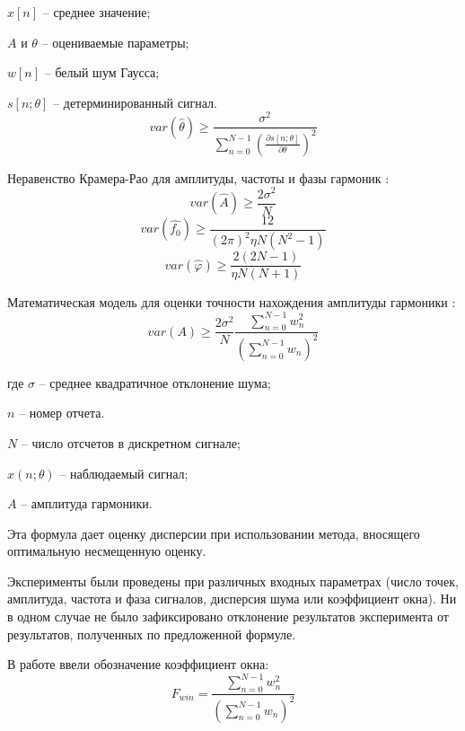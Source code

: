 $x[n]$ -- среднее значение;

$A$ и $\theta$  -- оцениваемые параметры;

$w[n]$ -- белый шум Гаусса;

$s[n;\theta]$ -- детерминированный сигнал.
\begin{equation}
	\label{eq:equation14}
	var(\hat{\theta}) \geq \frac{\sigma^2}{\displaystyle\sum_{n=0}^{N-1} \left(\frac{\partial s [n; \theta]}{\partial\theta}\right)^2} 
\end{equation}

Неравенство Крамера-Рао для амплитуды, частоты и фазы гармоник \cite{kay1993fundamentals}:
\begin{equation}
	\label{eq:equation16}
	var(\hat{A})\geq \frac{2  \sigma^2}{N} 
\end{equation}
\begin{equation}
	\label{eq:equation17}
	var(\hat{f_0})\geq \frac{12}{(2\pi)^2 \eta  N(N^2 - 1)}  
\end{equation}
\begin{equation}
	\label{eq:equation18}
	var(\hat{\varphi})\geq \frac{2(2N-1)}{\eta N(N+1)}  
\end{equation}

Математическая модель для оценки точности нахождения амплитуды гармоники \cite{altman2020boundary}:
\begin{equation}
	\label{eq:equation24}
	var(A)\geq \frac{2\sigma^2}{N} \frac{\sum_{n=0}^{N-1}w_n^2}{\left(\sum_{n=0}^{N-1} w_n \right)^2} 			  
\end{equation}

где $\sigma$ -- среднее квадратичное отклонение шума;

$n$ – номер отчета.

$N$ – число отсчетов в дискретном сигнале;

$x(n;\theta)$ – наблюдаемый сигнал;

$A$ – амплитуда гармоники. 

Эта формула дает оценку дисперсии при использовании метода, вносящего оптимальную несмещенную оценку. 

Эксперименты были проведены при различных входных параметрах (число точек, амплитуда, частота и фаза сигналов, дисперсия шума или коэффициент окна). Ни в одном случае не было зафиксировано отклонение результатов эксперимента от результатов, полученных по предложенной формуле.

В работе \cite{altman2020boundary} ввели обозначение коэффициент окна:
\begin{equation}
	\label{eq:equation25}
	F_{win}=\frac{\sum_{n=0}^{N-1}w_n^2}{\left(\sum_{n=0}^{N-1} w_n\right)^2}
\end{equation}

